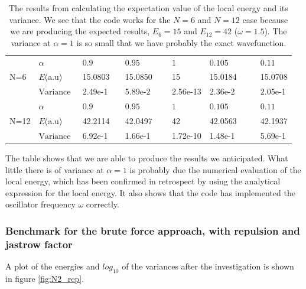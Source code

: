 \begin{table}[h!]
	\centering 
	\begin{tabular}{l @{}l @{ } l @{ } l @{ } l @{ } l @{ } l}
		\toprule
		\multirow{3}{*}{N=6}$~~\quad ~~$ & $\alpha~~~~$ & $0.9~~~~~~~~~~~~~$ & $0.95~~~~~~~~~~~~~$ & $1~~~~~~~~~~~~~$ & $0.105~~~~~~~~~~~~~$  & $0.11$ \\
		 & $E$(a.u) & 15.0803 & 15.0850 & 15 & 15.0184 & 15.0708\\ 
		 & $\textrm{Variance} ~~$ & 2.49e-1 & 5.89e-2 & 2.56e-13 & 2.36e-2 & 2.05e-1\\ 
		\midrule
		\multirow{3}{*}{N=12} & $\alpha~~~~$ & $0.9~~~~$ & $0.95~~~~$ & $1~~~~$ & $0.105~~~~$  & $0.11$ \\
		& $E$(a.u) & 42.2114 & 42.0497 & 42 & 42.0563 & 42.1937 \\ 
		& $\textrm{Variance} ~~$ & 6.92e-1 & 1.66e-1 & 1.72e-10 & 1.48e-1 & 5.69e-1\\ 
		\bottomrule
	\end{tabular}
	\caption{The results from calculating the expectation value of the local energy and its variance.
			We see that the code works for the $N=6$ and $N=12$ case because we are producing the expected results, $E_6 = 15$ and $E_{12} = 42$ ($\omega = 1.5$). 
			The variance at $\alpha=1$ is so small that we have probably the exact wavefunction.}
	\label{tab:N6_N12_norep}
\end{table}

The table shows that we are able to produce the results we anticipated.
What little there is of variance at $\alpha=1$ is probably due the numerical evaluation of the local energy, which has been confirmed in retrospect by using the analytical expression for the local energy. 
It also shows that the code has implemented the oscillator frequency $\omega$ correctly. 










\subsubsection{Benchmark for the brute force approach, with repulsion and jastrow factor}\label{sec:N2_rep}

A plot of the energies and $log_{10}$ of the variances after the investigation is shown in figure \ref{fig:N2_rep}.

